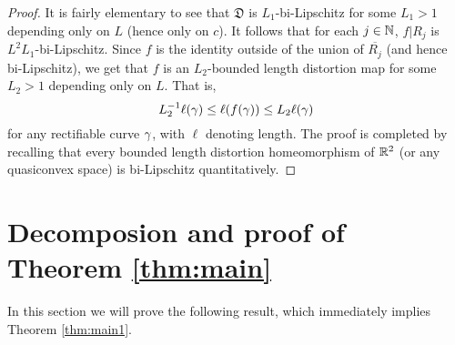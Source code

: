 \documentclass{amsart}
\begin{document}
\begin{proof}
It is fairly elementary to see that $\mathfrak{D}$ is $L_1$-bi-Lipschitz for some $L_1>1$ depending only on $L$ (hence only on $c$).
It follows that for each $j\in\mathbb{N}$, $f|R_j$ is $L^2L_1$-bi-Lipschitz. Since $f$ is the identity outside of the union of $\overline{R_j}$ (and hence bi-Lipschitz), we get that $f$ is an $L_2$-bounded length distortion map for some $L_2>1$ depending only on $L$. That is, 
\[ L_2^{-1}\ell(\gamma) \leq \ell(f(\gamma)) \leq L_2\ell(\gamma)\]
for any rectifiable curve $\gamma$, with $\ell$ denoting length. The proof is completed by recalling that every bounded length distortion homeomorphism of $\mathbb{R}^2$ (or any quasiconvex space) is bi-Lipschitz quantitatively.
\end{proof}





\section{Decomposion and proof of Theorem \ref{thm:main}}\label{sec:proof}

In this section we will prove the following result, which immediately implies Theorem \ref{thm:main1}.
\end{document}
